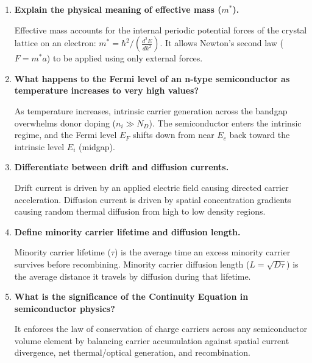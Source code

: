 \documentclass[12pt,a4paper]{article}
\newcommand{\Q}[1]{\textbf{#1}\par\noindent\ignorespaces}
\begin{document}
\begin{tcolorbox}[exambox, title={\textbf{Frequently Asked / Viva Questions}}]
\begin{enumerate}[topsep=0pt, label=\textbf{Q\arabic*.}, itemsep=5pt]
  \item \Q{Explain the physical meaning of effective mass ($m^*$).}
    Effective mass accounts for the internal periodic potential forces of the crystal lattice on an electron: $m^* = \hbar^2 / \left(\frac{d^2 E}{dk^2}\right)$. It allows Newton's second law ($F = m^* a$) to be applied using only external forces.
  \item \Q{What happens to the Fermi level of an n-type semiconductor as temperature increases to very high values?}
    As temperature increases, intrinsic carrier generation across the bandgap overwhelms donor doping ($n_i \gg N_D$). The semiconductor enters the intrinsic regime, and the Fermi level $E_F$ shifts down from near $E_c$ back toward the intrinsic level $E_i$ (midgap).
  \item \Q{Differentiate between drift and diffusion currents.}
    Drift current is driven by an applied electric field causing directed carrier acceleration. Diffusion current is driven by spatial concentration gradients causing random thermal diffusion from high to low density regions.
  \item \Q{Define minority carrier lifetime and diffusion length.}
    Minority carrier lifetime ($\tau$) is the average time an excess minority carrier survives before recombining. Minority carrier diffusion length ($L = \sqrt{D\tau}$) is the average distance it travels by diffusion during that lifetime.
  \item \Q{What is the significance of the Continuity Equation in semiconductor physics?}
    It enforces the law of conservation of charge carriers across any semiconductor volume element by balancing carrier accumulation against spatial current divergence, net thermal/optical generation, and recombination.
\end{enumerate}
\end{tcolorbox}
\end{document}
